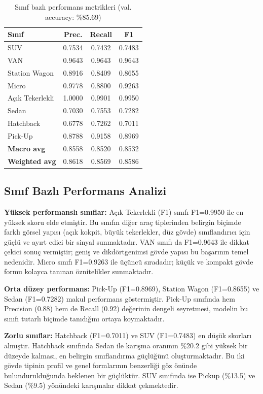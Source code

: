 \documentclass[conference]{IEEEtran}
\begin{document}
\begin{table}[h]
\caption{Sınıf bazlı performans metrikleri (val. accuracy: \%85.69)}
\label{tab:metrics}
\centering
\small
\begin{tabular}{lccc}
\toprule
\textbf{Sınıf}   & \textbf{Prec.} & \textbf{Recall} & \textbf{F1} \\
\midrule
SUV              & 0.7534 & 0.7432 & 0.7483 \\
VAN              & 0.9643 & 0.9643 & 0.9643 \\
Station Wagon    & 0.8916 & 0.8409 & 0.8655 \\
Micro            & 0.9778 & 0.8800 & 0.9263 \\
Açık Tekerlekli  & 1.0000 & 0.9901 & 0.9950 \\
Sedan            & 0.7030 & 0.7553 & 0.7282 \\
Hatchback        & 0.6778 & 0.7262 & 0.7011 \\
Pick-Up          & 0.8788 & 0.9158 & 0.8969 \\
\midrule
\textbf{Macro avg}    & 0.8558 & 0.8520 & 0.8532 \\
\textbf{Weighted avg} & 0.8618 & 0.8569 & 0.8586 \\
\bottomrule
\end{tabular}
\end{table}

\subsection{Sınıf Bazlı Performans Analizi}

\textbf{Yüksek performanslı sınıflar:} Açık Tekerlekli (F1) sınıfı
F1=0.9950 ile en yüksek skoru elde etmiştir. Bu sınıfın diğer araç
tiplerinden belirgin biçimde farklı görsel yapısı (açık kokpit, büyük
tekerlekler, düz gövde) sınıflandırıcı için güçlü ve ayırt edici
bir sinyal sunmaktadır. VAN sınıfı da F1=0.9643 ile dikkat çekici
sonuç vermiştir; geniş ve dikdörtgenimsi gövde yapısı bu başarının
temel nedenidir. Micro sınıfı F1=0.9263 ile üçüncü sıradadır; küçük
ve kompakt gövde formu kolayca tanınan öznitelikler sunmaktadır.

\textbf{Orta düzey performans:} Pick-Up (F1=0.8969), Station Wagon
(F1=0.8655) ve Sedan (F1=0.7282) makul performans göstermiştir.
Pick-Up sınıfında hem Precision (0.88) hem de Recall (0.92) değerinin
dengeli seyretmesi, modelin bu sınıfı tutarlı biçimde tanıdığını
ortaya koymaktadır.

\textbf{Zorlu sınıflar:} Hatchback (F1=0.7011) ve SUV (F1=0.7483)
en düşük skorları almıştır. Hatchback sınıfında Sedan ile karışma
oranının \%20.2 gibi yüksek bir düzeyde kalması, en belirgin
sınıflandırma güçlüğünü oluşturmaktadır. Bu iki gövde tipinin profil
ve genel formlarının benzerliği göz önünde bulundurulduğunda beklenen
bir güçlüktür. SUV sınıfında ise Pickup (\%13.5) ve Sedan (\%9.5)
yönündeki karışmalar dikkat çekmektedir.
\end{document}
